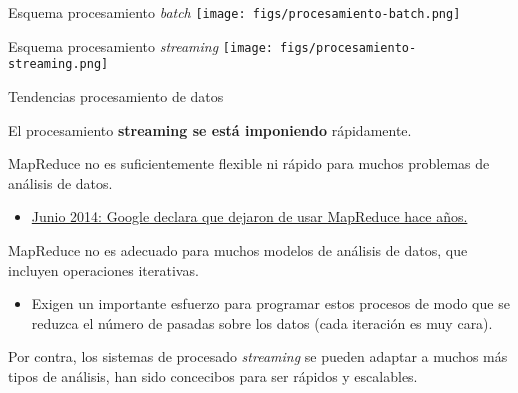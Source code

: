 
\begin{frame}{Esquema procesamiento \textit{batch}}
 \texttt{[image: figs/procesamiento-batch.png]}
\end{frame}


\begin{frame}{Esquema procesamiento \textit{streaming}}
 \texttt{[image: figs/procesamiento-streaming.png]}
\end{frame}


\begin{frame}{Tendencias procesamiento de datos}
 \begin{wideitemize}
 
 \item El procesamiento \textbf{streaming se está imponiendo} rápidamente.
 
 \item MapReduce no es suficientemente flexible ni rápido para muchos problemas
 de análisis de datos.
 
 \begin{itemize}
  \item \href{http://www.datacenterknowledge.com/archives/2014/06/25/google-dumps-mapreduce-favor-new-hyper-scale-analytics-system/}
  {Junio 2014: Google declara que dejaron de usar MapReduce hace años.}
 \end{itemize}

 \item MapReduce no es adecuado para muchos modelos de análisis de datos, que
 incluyen operaciones iterativas.
 
 \begin{itemize}
  \item Exigen un importante esfuerzo para programar estos procesos de modo que
  se reduzca el número de pasadas sobre los datos (cada iteración es muy cara).
 \end{itemize}

 \item Por contra, los sistemas de procesado \textit{streaming} se pueden adaptar
 a muchos más tipos de análisis, han sido concecibos para ser rápidos y escalables.
 
\end{wideitemize}

\end{frame}

